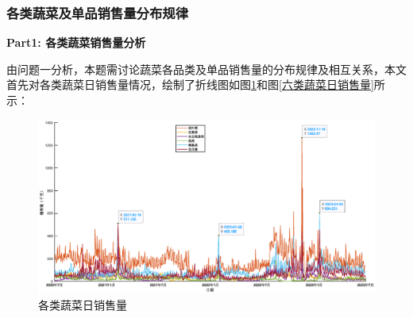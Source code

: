 \documentclass{my_paper}
\begin{document}
\subsubsection{各类蔬菜及单品销售量分布规律}
\textbf{Part1: 各类蔬菜销售量分析}\par
由问题一分析，本题需讨论蔬菜各品类及单品销售量的分布规律及相互关系，本文首先对各类蔬菜日销售量情况，绘制了折线图如图\ref{各类蔬菜日销售量}和图\ref{六类蔬菜日销售量}所示：
\begin{figure}[H]
 \centering
 \includegraphics[width=\textwidth]{各蔬菜类日销售量.eps} %
 \caption{各类蔬菜日销售量} %
 \label{各类蔬菜日销售量} %
\end{figure}\par
\end{document}
